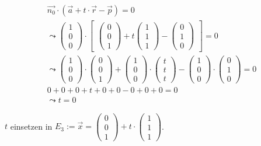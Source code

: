 \begin{gather}
\vec{n_0} \cdot (\vec{a}+t\cdot \vec{r}-\vec{p})=0\\
\leadsto 
\begin{pmatrix}
1\\0\\0
\end{pmatrix} \cdot 
\begin{bmatrix}
\begin{pmatrix}
0\\0\\1
\end{pmatrix}
+ t
\begin{pmatrix}
1\\1\\1
\end{pmatrix}
-
\begin{pmatrix}
0\\1\\0
\end{pmatrix}
\end{bmatrix} = 0\\
\leadsto
\begin{pmatrix}
1\\0\\0
\end{pmatrix}\cdot
\begin{pmatrix}
0\\0\\1
\end{pmatrix}
+
\begin{pmatrix}
1\\0\\0
\end{pmatrix}
\cdot
\begin{pmatrix}
t\\t\\t
\end{pmatrix}
-
\begin{pmatrix}
1\\0\\0
\end{pmatrix}
\cdot
\begin{pmatrix}
0\\1\\0
\end{pmatrix} =0\\
0+0+0+t+0+0-0+0+0=0\\
\leadsto t=0
\end{gather}

\ensuremath{t} einsetzen in \ensuremath{E_3:= \vec{x}=\begin{pmatrix}
		0\\0\\1
	\end{pmatrix} +t\cdot\begin{pmatrix}
		1\\1\\1
\end{pmatrix}}.\\


